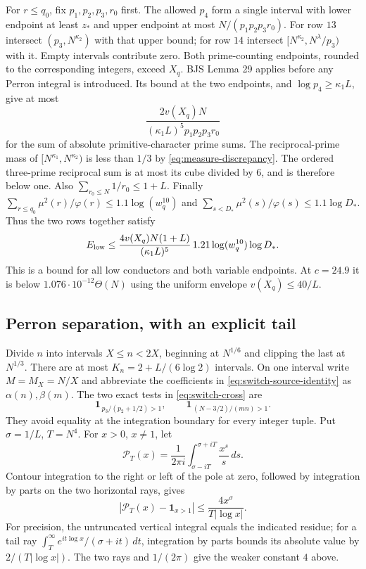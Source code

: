 \documentclass[11pt]{article}
\theoremstyle{definition}
\newcommand{\ind}{\mathbf 1}
\newcommand{\Th}{\Theta(N)}
\begin{document}
For $r\le q_0$, fix $p_1,p_2,p_3,r_0$ first.  The allowed $p_4$
form a single interval with lower endpoint at least $z_*$ and upper
endpoint at most $N/(p_1p_2p_3r_0)$.
For row $13$ intersect $(p_3,N^{\kappa_2})$ with that upper bound;
for row $14$ intersect $[N^{\kappa_2},N^{\lambda}/p_3)$ with it.
Empty intervals contribute zero.  Both prime-counting endpoints,
rounded to the corresponding integers, exceed $X_q$.
BJS Lemma 29 applies before any Perron integral is introduced.
Its bound at the two endpoints, and $\log p_4\ge\kappa_1L$, give
at most
\[
 \frac{2v(X_q)N}{(\kappa_1L)^5p_1p_2p_3r_0}
\]
for the sum of absolute primitive-character prime sums.
The reciprocal-prime mass of $[N^{\kappa_1},N^{\kappa_2})$ is
less than $1/3$ by \eqref{eq:measure-discrepancy}.  The ordered
three-prime reciprocal sum is at most its cube divided by $6$,
and is therefore below one.  Also
$\sum_{r_0\le N}1/r_0\le1+L$.  Finally
$\sum_{r\le q_0}\mu^2(r)/\varphi(r)\le1.1\log(w_q^{10})$ and
$\sum_{s<D_*}\mu^2(s)/\varphi(s)\le1.1\log D_*$.
Thus the two rows together satisfy
\begin{equation}\label{eq:switch-low}
 E_{\rm low}\le
 \frac{4v(X_q)N(1+L)}{(\kappa_1L)^5}
 \,1.21\log(w_q^{10})\log D_*.
\end{equation}
This is a bound for all low conductors and both variable endpoints.
At $c=24.9$ it is below $1.076\cdot10^{-12}\Th$ using the
uniform envelope $v(X_q)\le40/L$.

\subsection{Perron separation, with an explicit tail}

Divide $n$ into intervals $X\le n<2X$, beginning at $N^{1/6}$ and
clipping the last at $N^{1/3}$.  There are at most
$K_n=2+L/(6\log2)$ intervals.  On one interval write $M=M_X=N/X$
and abbreviate the coefficients in \eqref{eq:switch-source-identity}
as $\alpha(n),\beta(m)$.
The two exact tests in \eqref{eq:switch-cross} are
\[
 \ind_{\,p_3/(p_2+1/2)>1},\qquad
 \ind_{\,(N-3/2)/(mn)>1}.
\]
They avoid equality at the integration boundary for every integer
tuple.  Put $\sigma=1/L$, $T=N^4$.  For $x>0$, $x\ne1$, let
\[
 \mathscr P_T(x)=\frac1{2\pi i}
                \int_{\sigma-iT}^{\sigma+iT}\frac{x^s}{s}\,ds.
\]
Contour integration to the right or left of the pole at zero, followed
by integration by parts on the two horizontal rays, gives
\begin{equation}\label{eq:Perron-tail}
 |\mathscr P_T(x)-\ind_{x>1}|
 \le\frac{4x^\sigma}{T|\log x|}.
\end{equation}
For precision, the untruncated vertical integral equals the indicated
residue; for a tail ray
$\int_T^\infty e^{it\log x}/(\sigma+it)\,dt$, integration by parts
bounds its absolute value by $2/(T|\log x|)$.  The two rays and
$1/(2\pi)$ give the weaker constant $4$ above.
\end{document}
